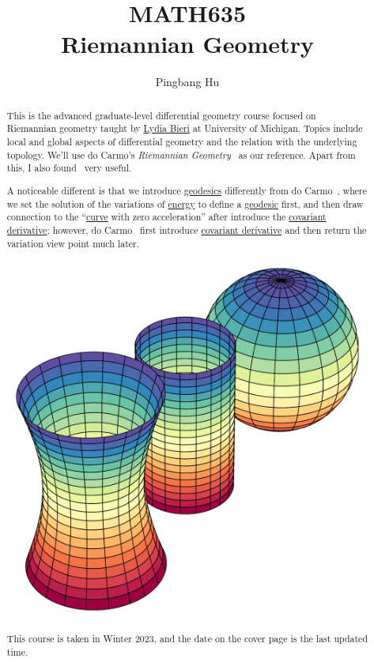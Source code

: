 \documentclass[a4paper]{report}
\author{Pingbang Hu}
\title{MATH635\\Riemannian Geometry}
\begin{document}
\maketitle

\begin{abstract}
	This is the advanced graduate-level differential geometry course focused on Riemannian geometry taught by \href{http://www-personal.umich.edu/~lbieri/}{Lydia Bieri} at University of Michigan. Topics include local and global aspects of differential geometry and the relation with the underlying topology. We'll use do Carmo's \emph{Riemannian Geometry}~\cite{flaherty2013riemannian} as our reference. Apart from this, I also found~\cite{Frederic2015} very useful.

	A noticeable different is that we introduce \hyperref[def:geodesic]{geodesics} differently from do Carmo~\cite{flaherty2013riemannian}, where we set the solution of the variations of \hyperref[def:energy]{energy} to define a \hyperref[def:geodesic]{geodesic} first, and then draw connection to the ``\hyperref[def:curve]{curve} with zero acceleration'' after introduce the \hyperref[def:covariant-derivative]{covariant derivative}; however, do Carmo~\cite{flaherty2013riemannian} first introduce \hyperref[def:covariant-derivative]{covariant derivative} and then return the variation view point much later.

	\vfill
	\begin{center}
		\includegraphics[width=.8\linewidth]{Figures/cover.png}
	\end{center}
	\vfill
	This course is taken in Winter 2023, and the date on the cover page is the last updated time.
\end{abstract}

\tableofcontents


\newpage
\appendix
\appendixpage{}



\newpage
\printbibliography{}
\end{document}
